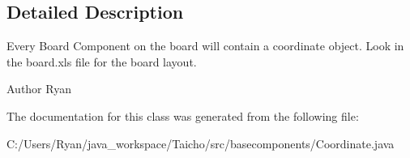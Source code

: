 \subsection{Detailed Description}
Every Board Component on the board will contain a coordinate object. Look in the board.\-xls file for the board layout. \begin{DoxyAuthor}{Author}
Ryan 
\end{DoxyAuthor}


The documentation for this class was generated from the following file\-:\begin{DoxyCompactItemize}
\item 
C\-:/\-Users/\-Ryan/java\-\_\-workspace/\-Taicho/src/basecomponents/Coordinate.\-java\end{DoxyCompactItemize}
